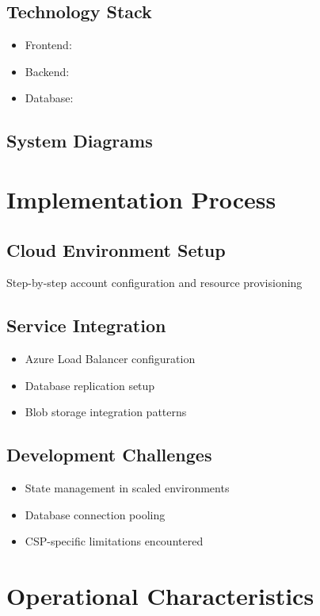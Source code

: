 \documentclass{llncs}
\begin{document}
\subsection{Technology Stack}
\begin{itemize}
    \item Frontend: 
    \item Backend: 
    \item Database: 

\end{itemize}

\subsection{System Diagrams}

\section{Implementation Process}
\subsection{Cloud Environment Setup}
Step-by-step account configuration and resource provisioning

\subsection{Service Integration}
\begin{itemize}
    \item Azure Load Balancer configuration
    \item Database replication setup
    \item Blob storage integration patterns
\end{itemize}

\subsection{Development Challenges}
\begin{itemize}
    \item State management in scaled environments
    \item Database connection pooling
    \item CSP-specific limitations encountered
\end{itemize}

\section{Operational Characteristics}
\end{document}

